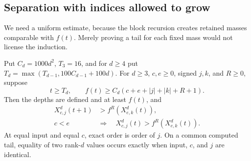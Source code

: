 \documentclass[11pt]{article}
\begin{document}
\subsection{Separation with indices allowed to grow}
We need a uniform estimate, because the block recursion creates retained
masses comparable with $f(t)$. Merely proving a tail for each fixed mass
would not license the induction.

\begin{lemma}\label{lem:uniform}
Put $C_d=1000d^2$, $T_3=16$, and for $d\ge4$ put
$T_d=\max(T_{d-1},100C_{d-1}+100d)$. For $d\ge3$, $c,e\ge0$, signed
$j,k$, and $R\ge0$, suppose
\begin{equation}\label{eq:region}
 t\ge T_d,\qquad
 f(t)\ge C_d(c+e+|j|+|k|+R+1).
\end{equation}
Then the depths are defined and at least $f(t)$, and
\begin{align*}
 X^d_{c,j}(t+1)&>f^R(X^d_{e,k}(t)),\\
 c<e\quad&\Longrightarrow\quad
 X^d_{c,j}(t)>f^R(X^d_{e,k}(t)).
\end{align*}
At equal input and equal $c$, exact order is order of $j$. On a common
computed tail, equality of two rank-$d$ values occurs exactly when input,
$c$, and $j$ are identical.
\end{lemma}
\end{document}
